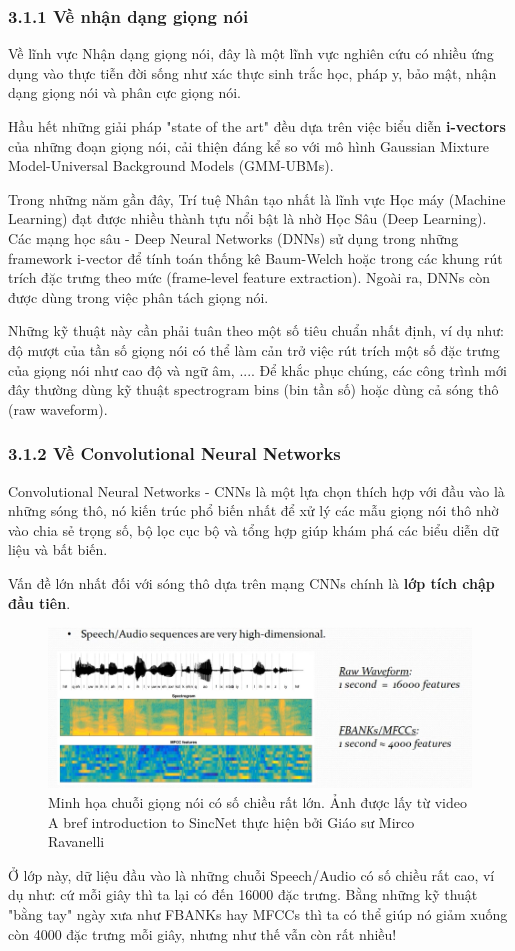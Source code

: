 \documentclass{article}
\begin{document}
	\subsubsection{3.1.1 Về nhận dạng giọng nói}
	\qquad Về lĩnh vực Nhận dạng giọng nói, đây là một lĩnh vực nghiên cứu có nhiều ứng dụng vào thực tiễn đời sống như xác thực sinh trắc học, pháp y, bảo mật, nhận dạng giọng nói và phân cực giọng nói.
	
	Hầu hết những giải pháp "state of the art" đều dựa trên việc biểu diễn \textbf{i-vectors} của những đoạn giọng nói, cải thiện đáng kể so với mô hình Gaussian Mixture Model-Universal Background Models (GMM-UBMs).
	
	Trong những năm gần đây, Trí tuệ Nhân tạo nhất là lĩnh vực Học máy (Machine Learning) đạt được nhiều thành tựu nổi bật là nhờ Học Sâu (Deep Learning). Các mạng học sâu - Deep Neural Networks (DNNs) sử dụng trong những framework i-vector để tính toán thống kê Baum-Welch hoặc trong các khung rút trích đặc trưng theo mức (frame-level feature extraction). Ngoài ra, DNNs còn được dùng trong việc phân tách giọng nói.
	
	Những kỹ thuật này cần phải tuân theo một số tiêu chuẩn nhất định, ví dụ như: độ mượt của tần số giọng nói có thể làm cản trở việc rút trích một số đặc trưng của giọng nói như cao độ và ngữ âm, .... Để khắc phục chúng, các công trình mới đây thường dùng kỹ thuật spectrogram bins (bin tần số) hoặc dùng cả sóng thô (raw waveform).
	
	\subsubsection{3.1.2 Về Convolutional Neural Networks}
	\qquad Convolutional Neural Networks - CNNs là một lựa chọn thích hợp với đầu vào là những sóng thô, nó kiến trúc phổ biến nhất để xử lý các mẫu giọng nói thô nhờ vào chia sẻ trọng số, bộ lọc cục bộ và tổng hợp giúp khám phá các biểu diễn dữ liệu và bất biến.
	
	Vấn đề lớn nhất đối với sóng thô dựa trên mạng CNNs chính là \textbf{lớp tích chập đầu tiên}.
	\begin{figure}[H]
		\centering
		\includegraphics[width=1\textwidth]{images/capture_01.png}
		\caption{Minh họa chuỗi giọng nói có số chiều rất lớn. Ảnh được lấy từ video A bref introduction to SincNet thực hiện bởi Giáo sư Mirco Ravanelli}
		\label{fig:writing-thesis}
	\end{figure}
	Ở lớp này, dữ liệu đầu vào là những chuỗi Speech/Audio có số chiều rất cao, ví dụ như: cứ mỗi giây thì ta lại có đến 16000 đặc trưng. Bằng những kỹ thuật "bằng tay" ngày xưa như FBANKs hay MFCCs thì ta có thể giúp nó giảm xuống còn 4000 đặc trưng mỗi giây, nhưng như thế vẫn còn rất nhiều!
	
\end{document}
